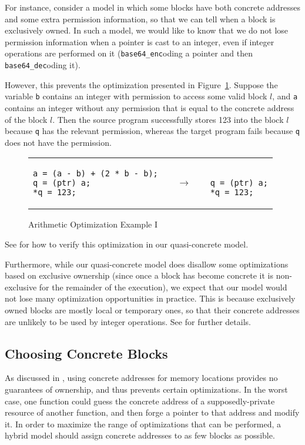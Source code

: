For instance, consider a model in which some blocks have both concrete addresses and some extra permission information, so that we can tell when a block is exclusively owned. In such a model, we would like to know that we do not lose permission information when a pointer is cast to an integer, even if integer operations are performed on it (\eg \texttt{base64\_enc}oding a pointer and then \texttt{base64\_dec}oding it).

However, this prevents the optimization presented in Figure~\ref{code:arith1}.
Suppose the variable \texttt{b} contains an integer with permission
  to access some valid block $l$, and \texttt{a} contains an integer
  without any permission that is equal to the concrete address of the
  block $l$. Then the source program successfully stores 123 into the block $l$
   because \texttt{q} has the relevant permission, whereas the target program fails
   because \texttt{q} does not have the permission.
%
\begin{figure}[t]
\center
\begin{tabular}{lll}
\begin{lstlisting}
a = (a - b) + (2 * b - b);
q = (ptr) a;
*q = 123;
\end{lstlisting}
&
$\quad\rightarrow\quad$
&
\begin{lstlisting}

q = (ptr) a;
*q = 123;
\end{lstlisting}
\end{tabular}
\caption{Arithmetic Optimization Example I}\label{code:arith1}
\end{figure}
%
See  for how to verify this optimization in our quasi-concrete model.

Furthermore, while our quasi-concrete model does disallow some optimizations based on exclusive ownership (since once a block has become concrete it is non-exclusive for the remainder of the execution), we expect that our model would not lose many optimization
opportunities in practice. This is because exclusively owned blocks are mostly local or temporary ones,
  so that their concrete addresses are unlikely to be used by integer operations. See  for further details.

\subsection{Choosing Concrete Blocks}
\label{idea:cast}
As discussed in , using concrete addresses for memory locations provides no guarantees of ownership, and thus prevents certain optimizations. In the worst case, one function could guess the concrete address of a supposedly-private resource of another function, and then forge a pointer to that address and modify it. In order to maximize the range of optimizations that can be performed, a hybrid model should assign concrete addresses to as few blocks as possible.

